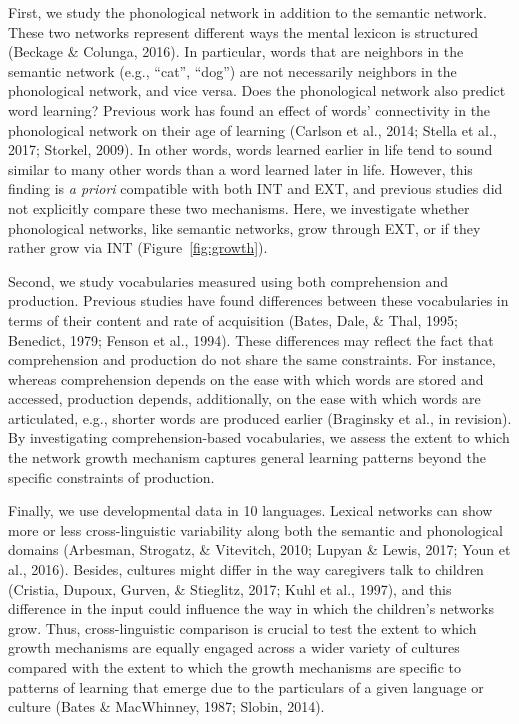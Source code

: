 \documentclass[english,floatsintext,man]{apa6}
\theoremstyle{definition}
\theoremstyle{definition}
\theoremstyle{definition}
\theoremstyle{remark}
\begin{document}
First, we study the phonological network in addition to the semantic
network. These two networks represent different ways the mental lexicon
is structured (Beckage \& Colunga, 2016). In particular, words that are
neighbors in the semantic network (e.g., \enquote{cat}, \enquote{dog})
are not necessarily neighbors in the phonological network, and vice
versa. Does the phonological network also predict word learning?
Previous work has found an effect of words' connectivity in the
phonological network on their age of learning (Carlson et al., 2014;
Stella et al., 2017; Storkel, 2009). In other words, words learned
earlier in life tend to sound similar to many other words than a word
learned later in life. However, this finding is \emph{a priori}
compatible with both INT and EXT, and previous studies did not
explicitly compare these two mechanisms. Here, we investigate whether
phonological networks, like semantic networks, grow through EXT, or if
they rather grow via INT (Figure~\ref{fig:growth}).

Second, we study vocabularies measured using both comprehension and
production. Previous studies have found differences between these
vocabularies in terms of their content and rate of acquisition (Bates,
Dale, \& Thal, 1995; Benedict, 1979; Fenson et al., 1994). These
differences may reflect the fact that comprehension and production do
not share the same constraints. For instance, whereas comprehension
depends on the ease with which words are stored and accessed, production
depends, additionally, on the ease with which words are articulated,
e.g., shorter words are produced earlier (Braginsky et al., in
revision). By investigating comprehension-based vocabularies, we assess
the extent to which the network growth mechanism captures general
learning patterns beyond the specific constraints of production.

Finally, we use developmental data in 10 languages. Lexical networks can
show more or less cross-linguistic variability along both the semantic
and phonological domains (Arbesman, Strogatz, \& Vitevitch, 2010; Lupyan
\& Lewis, 2017; Youn et al., 2016). Besides, cultures might differ in
the way caregivers talk to children (Cristia, Dupoux, Gurven, \&
Stieglitz, 2017; Kuhl et al., 1997), and this difference in the input
could influence the way in which the children's networks grow. Thus,
cross-linguistic comparison is crucial to test the extent to which
growth mechanisms are equally engaged across a wider variety of cultures
compared with the extent to which the growth mechanisms are specific to
patterns of learning that emerge due to the particulars of a given
language or culture (Bates \& MacWhinney, 1987; Slobin, 2014).
\end{document}
